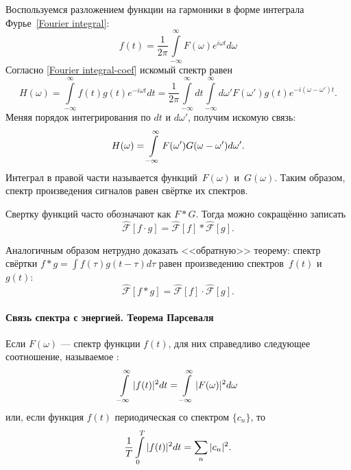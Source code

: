 Воспользуемся разложением функции на гармоники в форме
интеграла Фурье~\eqref{Fourier integral}:
\begin{equation*}
f(t) = \frac{1}{2\pi} \int\limits_{-\infty}^{\infty} F(\omega)e^{i\omega t} d\omega
\end{equation*}
Согласно \eqref{Fourier integral-coef} искомый спектр равен
\begin{equation*}
H(\omega) = \int\limits_{-\infty}^{\infty} f(t) g(t) e^{-i\omega t} dt =
\frac{1}{2\pi} \int\limits_{-\infty}^{\infty} dt
\int\limits_{-\infty}^{\infty} d\omega' F(\omega') g(t) e^{-i(\omega-\omega')t}.
\end{equation*}
Меняя порядок интегрирования по $dt$ и $d\omega'$, получим искомую связь:
\begin{equation}
    \eqmark{folding}
H(\omega) = \int\limits_{-\infty}^{\infty} F(\omega')G(\omega-\omega') d\omega'.
\end{equation}
Интеграл в правой части называется 
функций~$F(\omega)$ и~$G(\omega)$. Таким образом, спектр произведения сигналов
равен свёртке их спектров.


Свертку функций часто обозначают как $F * G$. Тогда можно сокращённо записать
\begin{equation*}
 \hat{\mathcal{F}}[f\cdot g] = \hat{\mathcal{F}}[f] * \hat{\mathcal{F}}[g].
\end{equation*}

Аналогичным образом нетрудно доказать <<обратную>> теорему:
спектр свёртки $f*g = \int f(\tau) g(t-\tau) d\tau$ равен произведению
спектров~$f(t)$ и~$g(t)$:
\begin{equation*}
\hat{\mathcal{F}}[f*g] = \hat{\mathcal{F}}[f] \cdot \hat{\mathcal{F}}[g].
\end{equation*}

\paragraph{Связь спектра с энергией. Теорема Парсеваля}
Если $F(\omega)$ --- спектр функции $f(t)$, для них справедливо следующее
соотношение, называемое :
\begin{equation}
    \eqmark{parseval-int}
\int\limits_{-\infty}^{\infty} |f(t)|^2 dt =
\int\limits_{-\infty}^{\infty} |F(\omega)|^2 d\omega
\end{equation}
или, если функция $f(t)$ периодическая со спектром $\{c_n\}$, то
\begin{equation}
    \eqmark{parseval-dicrete}
\frac{1}{T}\int\limits_{0}^{T} |f(t)|^2 dt =
\sum\limits_n |c_n|^2.
\end{equation}

